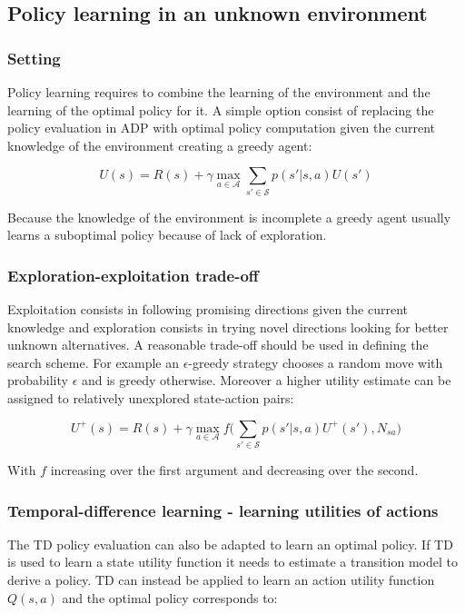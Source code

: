 	\subsection{Policy learning in an unknown environment}

		\subsubsection{Setting}
		Policy learning requires to combine the learning of the environment and the learning of the optimal policy for it.
		A simple option consist of replacing the policy evaluation in ADP with optimal policy computation given the current knowledge of the environment creating a greedy agent:

		$$U(s) = R(s) + \gamma\max\limits_{a\in\mathcal{A}}\sum\limits_{s'\in\mathcal{S}}p(s'|s,a)U(s')$$

		Because the knowledge of the environment is incomplete a greedy agent usually learns a suboptimal policy because of lack of exploration.

		\subsubsection{Exploration-exploitation trade-off}
		Exploitation consists in following promising directions given the current knowledge and exploration consists in trying novel directions looking for better unknown alternatives.
		A reasonable trade-off should be used in defining the search scheme.
		For example an $\epsilon$-greedy strategy chooses a random move with probability $\epsilon$ and is greedy otherwise.
		Moreover a higher utility estimate can be assigned to relatively unexplored state-action pairs:

		$$U^+(s) = R(s) + \gamma\max\limits_{a\in\mathcal{A}}f\biggl(\sum\limits_{s'\in\mathcal{S}}p(s'|s,a)U^+(s'),N_{sa}\biggr)$$

		With $f$ increasing over the first argument and decreasing over the second.

		\subsubsection{Temporal-difference learning - learning utilities of actions}
		The TD policy evaluation can also be adapted to learn an optimal policy.
		If TD is used to learn a state utility function it needs to estimate a transition model to derive a policy.
		TD can instead be applied to learn an action utility function $Q(s,a)$ and the optimal policy corresponds to:

